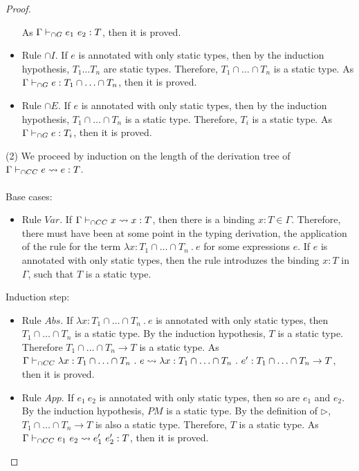 \documentclass[a4paper]{article}
\begin{document}
\begin{proof}
\begin{itemize}
    As $\Gamma \gits e_1\ e_2 : T$, then it is proved.
    \item Rule ${\cap} I$.
    If $e$ is annotated with only static types, then by the induction hypothesis, $T_1 \ldots T_n$ are static types.
    Therefore, $T_1 \cap \ldots \cap T_n$ is a static type.
    As $\Gamma \vdash_{\cap G} e : T_1 \cap \ldots \cap T_n$, then it is proved.
    \item Rule ${\cap} E$.
    If $e$ is annotated with only static types, then by the induction hypothesis, $T_1 \cap \ldots \cap T_n$ is a static type.
    Therefore, $T_i$ is a static type.
    As $\Gamma \vdash_{\cap G} e : T_i$, then it is proved.
\end{itemize}
(2) We proceed by induction on the length of the derivation tree of $\Gamma \vdash_{\cap CC} e \leadsto e : T$.\\\\
Base cases:
\begin{itemize}
    \item Rule $Var$.
    If $\Gamma \vdash_{\cap CC} x \leadsto x : T$, then there is a binding $x : T \in \Gamma$.
    Therefore, there must have been at some point in the typing derivation, the application of the rule for the term $\lambda x : T_1 \cap \ldots \cap T_n\ .\ e$ for some expressions $e$.
    If $e$ is annotated with only static types, then the rule introduzes the binding $x : T$ in $\Gamma$, such that $T$ is a static type.
\end{itemize}
Induction step:
\begin{itemize}
    \item Rule $Abs$.
    If $\lambda x : T_1 \cap \ldots \cap T_n\ .\ e$ is annotated with only static types, then $T_1 \cap \ldots \cap T_n$ is a static type.
    By the induction hypothesis, $T$ is a static type.
    Therefore $T_1 \cap \ldots \cap T_n \rightarrow T$ is a static type.
    As $\Gamma \vdash_{\cap CC} \lambda x : T_1 \cap \ldots \cap T_n\ .\ e \leadsto \lambda x : T_1 \cap \ldots \cap T_n\ .\ e' : T_1 \cap \ldots \cap T_n \rightarrow T$, then it is proved.
    \item Rule $App$.
    If $e_1\ e_2$ is annotated with only static types, then so are $e_1$ and $e_2$.
    By the induction hypothesis, $PM$ is a static type.
    By the definition of $\rhd$, $T_1 \cap \ldots \cap T_n \rightarrow T$ is also a static type.
    Therefore, $T$ is a static type.
    As $\Gamma \vdash_{\cap CC} e_1\ e_2 \leadsto e_1'\ e_2' : T$, then it is proved.
\end{itemize}
\end{proof}
\end{document}
